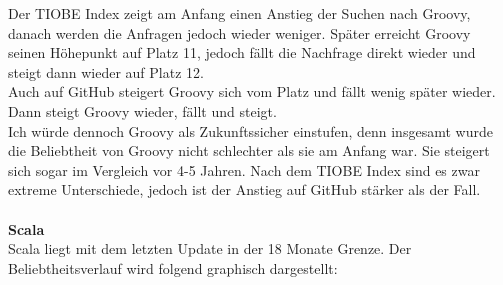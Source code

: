 \documentclass[ngerman]{article}
\begin{document}
    Der TIOBE Index zeigt am Anfang einen Anstieg der Suchen nach Groovy, danach werden die Anfragen jedoch wieder weniger. Später erreicht Groovy seinen Höhepunkt auf Platz 11, jedoch fällt die Nachfrage direkt wieder und steigt dann wieder auf Platz 12.\\
    Auch auf GitHub steigert Groovy sich vom Platz und fällt wenig später wieder. Dann steigt Groovy wieder, fällt und steigt.\\
    Ich würde dennoch Groovy als Zukunftssicher einstufen, denn insgesamt wurde die Beliebtheit von Groovy nicht schlechter als sie am Anfang war. Sie steigert sich sogar im Vergleich vor 4-5 Jahren. Nach dem TIOBE Index sind es zwar extreme Unterschiede, jedoch ist der Anstieg auf GitHub stärker als der Fall.\\\\
    \textbf{Scala}\\
    Scala liegt mit dem letzten Update in der 18 Monate Grenze. Der Beliebtheitsverlauf wird folgend graphisch dargestellt:
\end{document}
